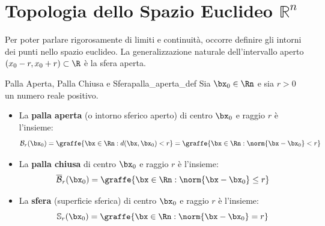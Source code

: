 \section{Topologia dello Spazio Euclideo \texorpdfstring{$\mathbb{R}^n$}{R\textasciicircum n}}

Per poter parlare rigorosamente di limiti e continuità, occorre definire gli intorni dei punti nello spazio euclideo. La generalizzazione naturale dell'intervallo aperto $(x_0 - r, x_0 + r) \subset \R$ è la sfera aperta.

\begin{definizione}{Palla Aperta, Palla Chiusa e Sfera}{palla_aperta_def}
Sia $\bx_0 \in \Rn$ e sia $r > 0$ un numero reale positivo.
\begin{itemize}
    \item La \textbf{palla aperta} (o intorno sferico aperto) di centro $\bx_0$ e raggio $r$ è l'insieme:
    \[
    \mathcal{B}_r(\bx_0) = \graffe{\bx \in \Rn : d(\bx, \bx_0) < r} = \graffe{\bx \in \Rn : \norm{\bx - \bx_0} < r}
    \]
    \item La \textbf{palla chiusa} di centro $\bx_0$ e raggio $r$ è l'insieme:
    \[
    \overline{\mathcal{B}}_r(\bx_0) = \graffe{\bx \in \Rn : \norm{\bx - \bx_0} \le r}
    \]
    \item La \textbf{sfera} (superficie sferica) di centro $\bx_0$ e raggio $r$ è l'insieme:
    \[
    \mathbb{S}_r(\bx_0) = \graffe{\bx \in \Rn : \norm{\bx - \bx_0} = r}
    \]
\end{itemize}
\end{definizione}

